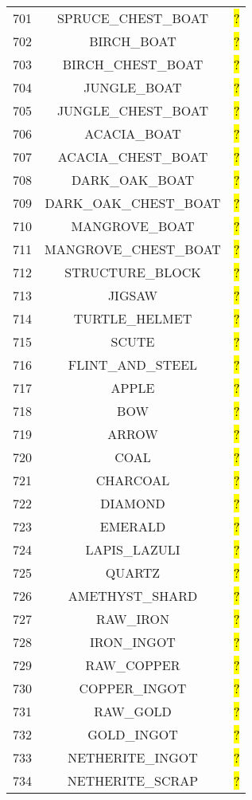 \documentclass[11pt]{article}
\newcommand\myworries[1]{\sethlcolor{red}\hl{#1}}
\begin{document}
\begin{longtable}{ |c|c|c| }
701 & SPRUCE\_CHEST\_BOAT & \myworries{?} \\
702 & BIRCH\_BOAT & \myworries{?} \\
703 & BIRCH\_CHEST\_BOAT & \myworries{?} \\
704 & JUNGLE\_BOAT & \myworries{?} \\
705 & JUNGLE\_CHEST\_BOAT & \myworries{?} \\
706 & ACACIA\_BOAT & \myworries{?} \\
707 & ACACIA\_CHEST\_BOAT & \myworries{?} \\
708 & DARK\_OAK\_BOAT & \myworries{?} \\
709 & DARK\_OAK\_CHEST\_BOAT & \myworries{?} \\
710 & MANGROVE\_BOAT & \myworries{?} \\
711 & MANGROVE\_CHEST\_BOAT & \myworries{?} \\
712 & STRUCTURE\_BLOCK & \myworries{?} \\
713 & JIGSAW & \myworries{?} \\
714 & TURTLE\_HELMET & \myworries{?} \\
715 & SCUTE & \myworries{?} \\
716 & FLINT\_AND\_STEEL & \myworries{?} \\
717 & APPLE & \myworries{?} \\
718 & BOW & \myworries{?} \\
719 & ARROW & \myworries{?} \\
720 & COAL & \myworries{?} \\
721 & CHARCOAL & \myworries{?} \\
722 & DIAMOND & \myworries{?} \\
723 & EMERALD & \myworries{?} \\
724 & LAPIS\_LAZULI & \myworries{?} \\
725 & QUARTZ & \myworries{?} \\
726 & AMETHYST\_SHARD & \myworries{?} \\
727 & RAW\_IRON & \myworries{?} \\
728 & IRON\_INGOT & \myworries{?} \\
729 & RAW\_COPPER & \myworries{?} \\
730 & COPPER\_INGOT & \myworries{?} \\
731 & RAW\_GOLD & \myworries{?} \\
732 & GOLD\_INGOT & \myworries{?} \\
733 & NETHERITE\_INGOT & \myworries{?} \\
734 & NETHERITE\_SCRAP & \myworries{?} \\

\end{longtable}
\end{document}
